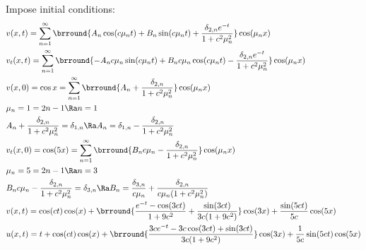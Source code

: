 Impose initial conditions:
\begin{align*}
    &v(x,t)=\sum_{n=1}^\infty\brround{A_n\cos(c\mu_nt)+B_n\sin(c\mu_nt)+\frac{\delta_{2,n}e^{-t}}{1+c^2\mu_n^2}}\cos(\mu_nx)\\
    &v_t(x,t)=\sum_{n=1}^\infty\brround{-A_nc\mu_n\sin(c\mu_nt)+B_nc\mu_n\cos(c\mu_nt)-\frac{\delta_{2,n}e^{-t}}{1+c^2\mu_n^2}}\cos(\mu_nx)\\
    &v(x,0)=\cos x=\sum_{n=1}^\infty\brround{A_n+\frac{\delta_{2,n}}{1+c^2\mu_n^2}}\cos(\mu_nx)\\
    &\mu_n=1=2n-1\Ra n=1\\
    &A_n+\frac{\delta_{2,n}}{1+c^2\mu_n^2}=\delta_{1,n}\Ra A_n=\delta_{1,n}-\frac{\delta_{2,n}}{1+c^2\mu_n^2}\\
    &v_t(x,0)=\cos(5x)=\sum_{n=1}^\infty \brround{B_nc\mu_n-\frac{\delta_{2,n}}{1+c^2\mu_n^2}}\cos(\mu_nx)\\
    &\mu_n=5=2n-1\Ra n=3\\
    &B_nc\mu_n-\frac{\delta_{2,n}}{1+c^2\mu_n^2}=\delta_{3,n}\Ra B_n=\frac{\delta_{3,n}}{c\mu_n}+\frac{\delta_{2,n}}{c\mu_n(1+c^2\mu_n^2)}\\
    &v(x,t)=\cos(ct)\cos(x)+\brround{\frac{e^{-t}-\cos(3ct)}{1+9c^2}+\frac{\sin(3ct)}{3c(1+9c^2)}}\cos(3x)+\frac{\sin(5ct)}{5c}\cos(5x)\\
    &u(x,t)=t+\cos(ct)\cos(x)+\brround{\frac{3ce^{-t}-3c\cos(3ct)+\sin(3ct)}{3c(1+9c^2)}}\cos(3x)+\frac{1}{5c}\sin(5ct)\cos(5x)
\end{align*}

